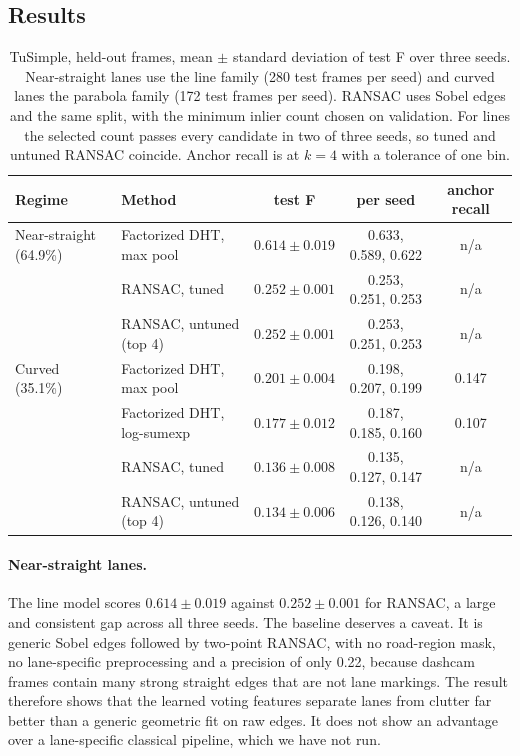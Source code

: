 \documentclass[11pt]{article}
\begin{document}
\subsection{Results}
\begin{table}[t]
\centering
\caption{TuSimple, held-out frames, mean $\pm$ standard deviation of test F over three seeds. Near-straight lanes use the line family (280 test frames per seed) and curved lanes the parabola family (172 test frames per seed). RANSAC uses Sobel edges and the same split, with the minimum inlier count chosen on validation. For lines the selected count passes every candidate in two of three seeds, so tuned and untuned RANSAC coincide. Anchor recall is at $k=4$ with a tolerance of one bin.}
\label{tab:real}
\footnotesize
\setlength{\tabcolsep}{4pt}
\begin{tabular}{llccc}
\toprule
\textbf{Regime} & \textbf{Method} & \textbf{test F} & \textbf{per seed} & \textbf{anchor recall} \\
\midrule
Near-straight (64.9\%) & Factorized DHT, max pool & $0.614\pm0.019$ & 0.633, 0.589, 0.622 & n/a \\
                       & RANSAC, tuned            & $0.252\pm0.001$ & 0.253, 0.251, 0.253 & n/a \\
                       & RANSAC, untuned (top 4)  & $0.252\pm0.001$ & 0.253, 0.251, 0.253 & n/a \\
\midrule
Curved (35.1\%)        & Factorized DHT, max pool & $0.201\pm0.004$ & 0.198, 0.207, 0.199 & 0.147 \\
                       & Factorized DHT, log-sumexp & $0.177\pm0.012$ & 0.187, 0.185, 0.160 & 0.107 \\
                       & RANSAC, tuned            & $0.136\pm0.008$ & 0.135, 0.127, 0.147 & n/a \\
                       & RANSAC, untuned (top 4)  & $0.134\pm0.006$ & 0.138, 0.126, 0.140 & n/a \\
\bottomrule
\end{tabular}
\end{table}

\paragraph{Near-straight lanes.} The line model scores $0.614\pm0.019$ against $0.252\pm0.001$ for RANSAC, a large and consistent gap across all three seeds. The baseline deserves a caveat. It is generic Sobel edges followed by two-point RANSAC, with no road-region mask, no lane-specific preprocessing and a precision of only 0.22, because dashcam frames contain many strong straight edges that are not lane markings. The result therefore shows that the learned voting features separate lanes from clutter far better than a generic geometric fit on raw edges. It does not show an advantage over a lane-specific classical pipeline, which we have not run.
\end{document}

